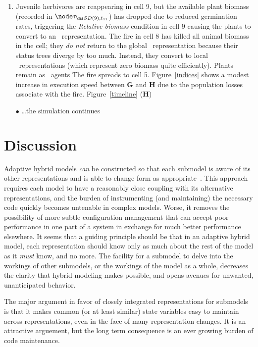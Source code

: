 \begin{enumerate}
\item %
Juvenile herbivores are reappearing in cell 9, but the available plant
biomass (recorded in $\stsd{9}{t_{11}}$) has dropped due to reduced
germination rates, triggering the \emph{Relative biomass} condition in
cell 9 causing the plants to convert to an \IB\ rep\-re\-sen\-ta\-tion.  The
fire in cell 8 has killed all animal biomass in the cell; they
\emph{do not} return to the global \SD\ rep\-re\-sen\-ta\-tion because their
status trees diverge by too much.  Instead, they convert to local
\SD\ rep\-re\-sen\-ta\-tions (which represent zero biomass quite
efficiently). Plants remain as \IB\ agents The fire spreads to cell
5. Figure~\ref{indices} shows a modest increase in execution speed
between \textbf{G} and \textbf{H} due to the population losses
associate with the fire. 
Figure~\ref{timeline} (\textbf{H})

\item[$\bullet$] \ldots the simulation continues
\end{enumerate}


\section{Discussion}

Adaptive hybrid models \emph{can} be constructed so that each
submodel is aware of its other rep\-re\-sen\-ta\-tions and is able to change
form as appropriate~\citep{gray2012adaptive}. This approach requires each 
model to have a reasonably close coupling with its alternative
rep\-re\-sen\-ta\-tions, and the burden of instrumenting (and maintaining) the
necessary code quickly becomes untenable in complex models.  Worse, it
removes the possibility of more subtle con\-fig\-ur\-a\-tion management that
can accept poor performance in one part of a system in exchange for
much better performance elsewhere.  It seems that a guiding principle
should be that in an adaptive hybrid model, each rep\-re\-sen\-ta\-tion should
know only as much about the rest of the model as it \emph{must} know,
and no more. The facility for a sub\-model to delve into the workings of
other sub\-models, or the workings of the model as a whole, decreases
the clarity that hybrid modeling makes possible, and opens avenues
for unwanted, unanticipated behavior.

The major argument in favor of closely integrated rep\-re\-sen\-ta\-tions for
sub\-models is that it makes common (or at least similar) state
variables easy to maintain across rep\-re\-sen\-ta\-tions, even in the face of
many rep\-re\-sen\-ta\-tion changes. It is an attractive arguement, but the
long term consequence is an ever growing burden of code maintenance.

